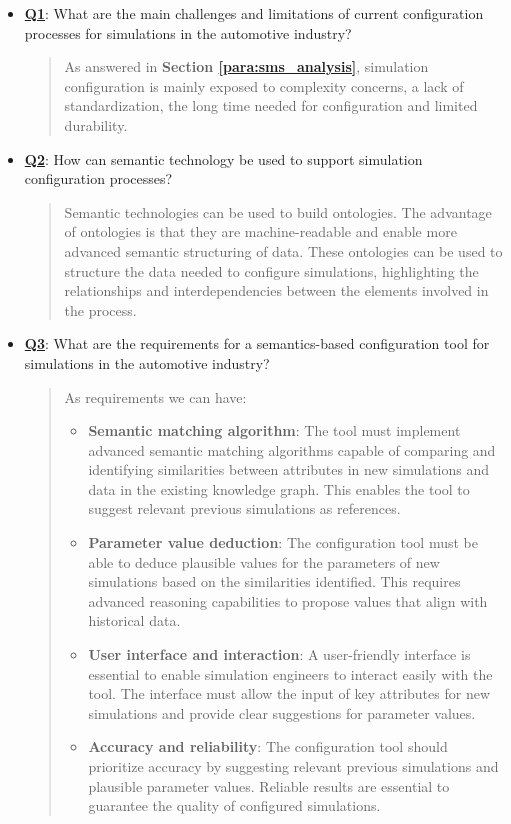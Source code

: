 \begin{itemize}
    \item \hyperref[Q1]{\textbf{Q1}}: What are the main challenges and limitations of current configuration processes for simulations in the automotive industry?
    \begin{quote}
        As answered in \textbf{Section \ref{para:sms_analysis}}, simulation configuration is mainly exposed to complexity concerns, a lack of standardization, the long time needed for configuration and limited durability.\\
    \end{quote}

    \item \hyperref[Q2]{\textbf{Q2}}: How can semantic technology be used to support simulation configuration processes?
    \begin{quote}
        Semantic technologies can be used to build ontologies. The advantage of ontologies is that they are machine-readable and enable more advanced semantic structuring of data. These ontologies can be used to structure the data needed to configure simulations, highlighting the relationships and interdependencies between the elements involved in the process.\\
    \end{quote}
    
    \item \hyperref[Q3]{\textbf{Q3}}: What are the requirements for a semantics-based configuration tool for simulations in the automotive industry?
    \begin{quote}
        As requirements we can have:
        \begin{itemize}
            \item \textbf{Semantic matching algorithm}: The tool must implement advanced semantic matching algorithms capable of comparing and identifying similarities between attributes in new simulations and data in the existing knowledge graph. This enables the tool to suggest relevant previous simulations as references.
            \item \textbf{Parameter value deduction}: The configuration tool must be able to deduce plausible values for the parameters of new simulations based on the similarities identified. This requires advanced reasoning capabilities to propose values that align with historical data.
            \item \textbf{User interface and interaction}: A user-friendly interface is essential to enable simulation engineers to interact easily with the tool. The interface must allow the input of key attributes for new simulations and provide clear suggestions for parameter values.
            \item \textbf{Accuracy and reliability}: The configuration tool should prioritize accuracy by suggesting relevant previous simulations and plausible parameter values. Reliable results are essential to guarantee the quality of configured simulations.\\
        \end{itemize}
    \end{quote}
    

\end{itemize}
